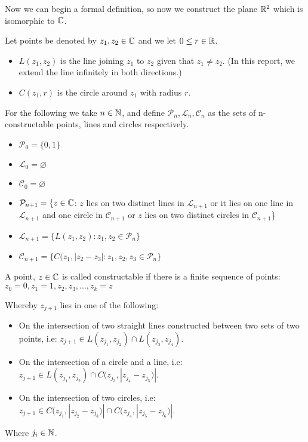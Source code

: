 Now we can begin a formal definition, so now we construct the plane $\mathbb R^2$ which is isomorphic to $\mathbb C$. 
\begin{definition}
Let points be denoted by $z_1,z_2 \in \mathbb C$ and we let $0\leq r \in \mathbb R$.
    \begin{itemize}
        \item $L(z_1,z_2)$ is the line joining $z_1$ to $z_2$ given that $z_1 \neq z_2$. (In this report, we extend the line infinitely in both directions.)
        \item $C(z_1,r)$ is the circle around $z_1$ with radius $r$.
    \end{itemize}
    For the following we take $n \in \mathbb N$, and define $\mathcal{P}_n,\mathcal{L}_n,\mathcal{C}_n$ as the sets of n-constructable points, lines and circles respectively.
    \begin{itemize}
        \item $\mathcal{P}_0=\{0,1\}$
        \item $\mathcal{L}_0=\varnothing$
        \item $\mathcal{C}_0=\varnothing$
        \item $\mathcal{P}_{n+1}=\{z\in \mathbb C $: $z$ lies on two distinct lines in $\mathcal{L}_{n+1}$ or it lies on one line in $\mathcal{L}_{n+1}$ and one circle in $\mathcal{C}_{n+1}$ or $z$ lies on two distinct circles in $\mathcal{C}_{n+1}$\}
        \item $\mathcal{L}_{n+1}=\{L(z_1,z_2) : z_1,z_2\in \mathcal{P}_n\}$
        \item $\mathcal{C}_{n+1}=\{C(z_1,|z_2-z_3|:z_1,z_2,z_3\in \mathcal{P}_n\}$
    \end{itemize}
\end{definition}

\begin{definition}\label{def:constructable-point}
    A point, $z \in \mathbb C$ is called constructable if there is a finite sequence of points:
    $z_0=0,z_1=1,z_2,z_3,...,z_k=z$

    Whereby $z_{j+1}$ lies in one of the following:
    \begin{itemize}
        \item On the intersection of two straight lines constructed between two sets of two points, i.e:
        $z_{j+1}\in L(z_{j_1},z_{j_2})\cap L(z_{j_3},z_{j_4})$.
        \item On the intersection of a circle and a line, i.e:
        $z_{j+1}\in L(z_{j_1},z_{j_2})\cap C(z_{j_3},|z_{j_4}-z_{j_5})|$.
        \item On the intersection of two circles, i.e:
        $z_{j+1}\in C(z_{j_1},|z_{j_2}-z_{j_3})|\cap C(z_{j_4},|z_{j_5}-z_{j_6})|$. 
    \end{itemize}
    Where $j_i\in \mathbb N$.
\end{definition}

